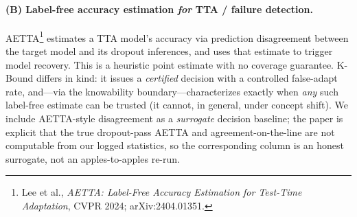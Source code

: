 \paragraph{(B) Label-free accuracy estimation \emph{for} TTA / failure detection.}
AETTA\footnote{Lee et al., \emph{AETTA: Label-Free Accuracy Estimation for Test-Time
Adaptation}, CVPR 2024; arXiv:2404.01351.} estimates a TTA model's accuracy via
prediction disagreement between the target model and its dropout inferences, and uses
that estimate to trigger model recovery. This is a heuristic point estimate with no
coverage guarantee. K-Bound differs in kind: it issues a \emph{certified} decision
with a controlled false-adapt rate, and---via the knowability boundary---characterizes
exactly when \emph{any} such label-free estimate can be trusted (it cannot, in
general, under concept shift). We include AETTA-style disagreement as a
\emph{surrogate} decision baseline; the paper is explicit that the true dropout-pass
AETTA and agreement-on-the-line are not computable from our logged statistics, so the
corresponding column is an honest surrogate, not an apples-to-apples re-run.

